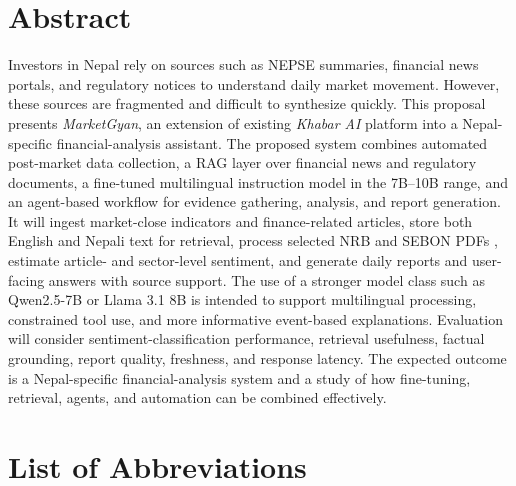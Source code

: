 \documentclass[12pt,a4paper]{report}
\begin{document}

\chapter*{Abstract}
Investors in Nepal rely on sources such as \ac{NEPSE} summaries, financial news portals, and regulatory notices to understand daily market movement. However, these sources are fragmented and difficult to synthesize quickly. This proposal presents \textit{MarketGyan}, an extension of existing \textit{Khabar AI} platform into a Nepal-specific financial-analysis assistant. The proposed system combines automated post-market data collection, a \ac{RAG} layer over financial news and regulatory documents, a fine-tuned multilingual instruction model in the 7B--10B range, and an agent-based workflow for evidence gathering, analysis, and report generation. It will ingest market-close indicators and finance-related articles, store both English and Nepali text for retrieval, process selected \ac{NRB} and \ac{SEBON} PDFs , estimate article- and sector-level sentiment, and generate daily reports and user-facing answers with source support. The use of a stronger model class such as Qwen2.5-7B or Llama 3.1 8B is intended to support multilingual processing, constrained tool use, and more informative event-based explanations. Evaluation will consider sentiment-classification performance, retrieval usefulness, factual grounding, report quality, freshness, and response latency. The expected outcome is a Nepal-specific financial-analysis system and a study of how fine-tuning, retrieval, agents, and automation can be combined effectively.

\tableofcontents
\clearpage

\listoffigures
{}
\clearpage

\chapter*{List of Abbreviations}
\begin{acronym}[QLoRA]
\end{acronym}
\clearpage
\end{document}
